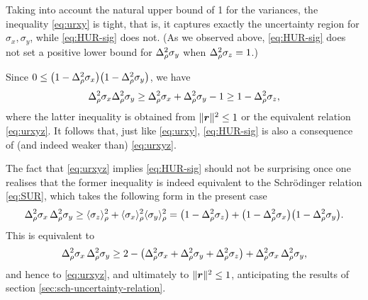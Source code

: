 Taking into account the natural upper bound of 1 for the variances, the  inequality \eqref{eq:urxy} is tight, that is, it captures exactly the uncertainty region for $\sigma_x,\sigma_y$, while \eqref{eq:HUR-sig} does not. (As we observed above, \eqref{eq:HUR-sig} does not set a positive lower bound for $\varr{\sigma_y}$ when $\varr{\sigma_z}=1$.)

Since $0\le\bigl(1-\varr{\sigma_x}\bigr)\bigl(1-\varr{\sigma_y}\bigr)$, we have
\begin{equation}
  \varr{\sigma_x}\varr{\sigma_y}\ge \varr{\sigma_x}+\varr{\sigma_y}-1\ge1-\varr{\sigma_z},
\end{equation}
where the latter inequality is obtained from $\|\bm{r} \|^2\le 1$ or the equivalent relation \eqref{eq:urxyz}. It follows that, just like \eqref{eq:urxy}, \eqref{eq:HUR-sig} is also a consequence of (and indeed weaker than) \eqref{eq:urxyz}.


The fact that \eqref{eq:urxyz} implies \eqref{eq:HUR-sig} should not be surprising once one realises that the former inequality  is indeed equivalent to the Schr\"odinger relation \eqref{eq:SUR}, which takes the following form in the present case
\begin{equation}
  \varr{\sigma_x}\,\varr{\sigma_y}\geq \langle\sigma_z\rangle_\rho^2+\langle\sigma_x\rangle_\rho^2\langle\sigma_y\rangle_\rho^2=\bigl(1-\varr{\sigma_z}\bigr)+
  \bigl(1-\varr{\sigma_x}\bigr)\bigl(1-\varr{\sigma_y}\bigr).
\end{equation}
This is equivalent to
\begin{equation}
  \varr{\sigma_x}\,\varr{\sigma_y}\geq 2-\bigl(\varr{\sigma_x}+\varr{\sigma_y}+\varr{\sigma_z} \bigr) +\varr{\sigma_x}\,\varr{\sigma_y},
\end{equation}
and hence to \eqref{eq:urxyz}, and ultimately to $\|\bm{r}\|^2\le 1$, anticipating the results of section \ref{sec:sch-uncertainty-relation}.


